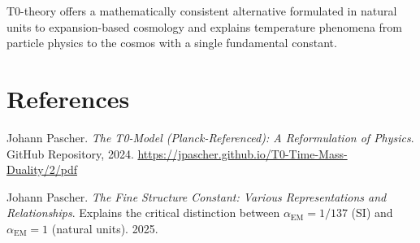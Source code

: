 \documentclass[12pt,a4paper]{article}
\begin{document}
	\begin{revolutionary}
		T0-theory offers a mathematically consistent alternative formulated in natural units to expansion-based cosmology and explains temperature phenomena from particle physics to the cosmos with a single fundamental constant.
	\end{revolutionary}
	
	\section{References}
	
	\begin{thebibliography}{2}
		Johann Pascher.
		\textit{The T0-Model (Planck-Referenced): A Reformulation of Physics}.
		GitHub Repository, 2024.
		\url{https://jpascher.github.io/T0-Time-Mass-Duality/2/pdf}
		
		Johann Pascher.
		\textit{The Fine Structure Constant: Various Representations and Relationships}.
		Explains the critical distinction between $\alpha_{\text{EM}} = 1/137$ (SI) and $\alpha_{\text{EM}} = 1$ (natural units).
		2025.
	\end{thebibliography}
	
\end{document}
